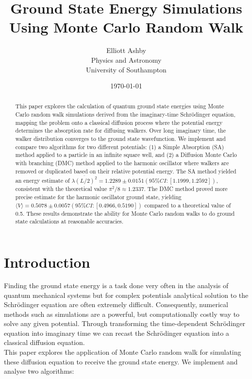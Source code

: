 \documentclass[reqno]{amsart}
\title{Ground State Energy Simulations Using Monte Carlo Random Walk}
\author[Elliott Ashby]{Elliott Ashby \\ Physics and Astronomy \\ University of Southampton}
\date{\monthyeardate\today}
\numberwithin{equation}{section}
\numberwithin{figure}{section}
\begin{document}
\begin{abstract}
    This paper explores the calculation of quantum ground state energies using Monte Carlo random walk simulations derived from the imaginary-time Schrödinger equation, mapping the problem onto a classical diffusion process where the potential energy determines the absorption rate for diffusing walkers. Over long imaginary time, the walker distribution converges to the ground state wavefunction. We implement and compare two algorithms for two different potentials: (1) a Simple Absorption (SA) method applied to a particle in an infinite square well, and (2) a Diffusion Monte Carlo with branching (DMC) method applied to the harmonic oscillator where walkers are removed or duplicated based on their relative potential energy. The SA method yielded an energy estimate of $\overline{\lambda (L/2)^2} = 1.2289 \pm 0.0151 (95\% CI:[1.1999, 1.2592])$, consistent with the theoretical value $\pi^2/8 \approx 1.2337$. The DMC method proved more precise estimate for the harmonic oscillator ground state, yielding $\langle V \rangle = 0.5078 \pm 0.0057 (95\% CI: [0.4966, 0.5190])$ compared to a theoretical value of 0.5. These results demonstrate the ability for Monte Carlo random walks to do ground state calculations at reasonable accuracies.
\end{abstract}
\vspace*{-2cm}
\maketitle
\tableofcontents
\newpage
\section{Introduction}

Finding the ground state energy is a task done very often in the analysis of quantum mechanical systems but for complex potentials analytical solution to the Schrödinger equation are often extremely difficult. Consequently, numerical methods such as simulations are a powerful, but computationally costly way to solve any given potential. Through transforming the time-dependent Schrödinger equation into imaginary time we can recast the Schrödinger equation into a classical diffusion equation. \\

This paper explores the application of Monte Carlo random walk for simulating these diffusion equation to receive the ground state energy. We implement and analyse two algorithms:
\end{document}
